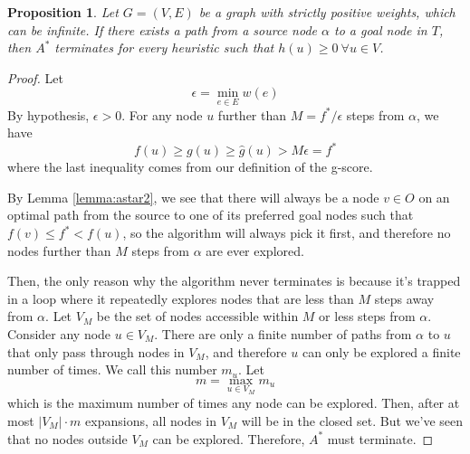 \documentclass[12pt]{report}
\newtheorem{proposition}[theorem]{Proposition}
\begin{document}
\begin{proposition}
\label{prop:astar-termination}
Let $G = (V, E)$ be a graph with strictly positive weights, which can be infinite. If there exists a path from a source node $\alpha$ to a goal node in $T$, then $A^*$ terminates for every heuristic such that $h(u) \geq 0 \  \forall u \in V$.
\end{proposition}
\begin{proof}
Let
\[ \epsilon = \min_{e \in E} w(e) \]
By hypothesis, $\epsilon > 0$. For any node $u$ further than $M = f^*/\epsilon$ steps from $\alpha$, we have
\[ f(u) \geq g(u) \geq \hat{g}(u) > M \epsilon = f^* \]
where the last inequality comes from our definition of the g-score.

By Lemma \ref{lemma:astar2}, we see that there will always be a node $v \in O$ on an optimal path from the source to one of its preferred goal nodes such that $f(v) \leq f^* < f(u)$, so the algorithm will always pick it first, and therefore no nodes further than $M$ steps from $\alpha$ are ever explored.

Then, the only reason why the algorithm never terminates is because it's trapped in a loop where it repeatedly explores nodes that are less than $M$ steps away from $\alpha$. Let $V_M$ be the set of nodes accessible within $M$ or less steps from $\alpha$. Consider any node $u \in V_M$. There are only a finite number of paths from $\alpha$ to $u$ that only pass through nodes in $V_M$, and therefore $u$ can only be explored a finite number of times. We call this number $m_u$. Let
\[ m = \max_{u \in V_M} m_u \]
which is the maximum number of times any node can be explored. Then, after at most $|V_M| \cdot m$ expansions, all nodes in $V_M$ will be in the closed set. But we've seen that no nodes outside $V_M$ can be explored. Therefore, $A^*$ must terminate.
\end{proof}
\end{document}
